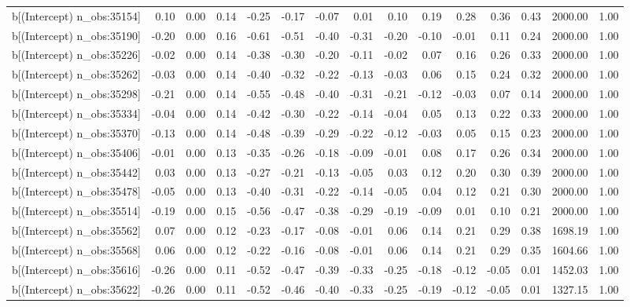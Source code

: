 \begin{table}[ht]
\begin{tabular}{rrrrrrrrrrrrrrr}
  b[(Intercept) n\_obs:35154] & 0.10 & 0.00 & 0.14 & -0.25 & -0.17 & -0.07 & 0.01 & 0.10 & 0.19 & 0.28 & 0.36 & 0.43 & 2000.00 & 1.00 \\ 
  b[(Intercept) n\_obs:35190] & -0.20 & 0.00 & 0.16 & -0.61 & -0.51 & -0.40 & -0.31 & -0.20 & -0.10 & -0.01 & 0.11 & 0.24 & 2000.00 & 1.00 \\ 
  b[(Intercept) n\_obs:35226] & -0.02 & 0.00 & 0.14 & -0.38 & -0.30 & -0.20 & -0.11 & -0.02 & 0.07 & 0.16 & 0.26 & 0.33 & 2000.00 & 1.00 \\ 
  b[(Intercept) n\_obs:35262] & -0.03 & 0.00 & 0.14 & -0.40 & -0.32 & -0.22 & -0.13 & -0.03 & 0.06 & 0.15 & 0.24 & 0.32 & 2000.00 & 1.00 \\ 
  b[(Intercept) n\_obs:35298] & -0.21 & 0.00 & 0.14 & -0.55 & -0.48 & -0.40 & -0.31 & -0.21 & -0.12 & -0.03 & 0.07 & 0.14 & 2000.00 & 1.00 \\ 
  b[(Intercept) n\_obs:35334] & -0.04 & 0.00 & 0.14 & -0.42 & -0.30 & -0.22 & -0.14 & -0.04 & 0.05 & 0.13 & 0.22 & 0.33 & 2000.00 & 1.00 \\ 
  b[(Intercept) n\_obs:35370] & -0.13 & 0.00 & 0.14 & -0.48 & -0.39 & -0.29 & -0.22 & -0.12 & -0.03 & 0.05 & 0.15 & 0.23 & 2000.00 & 1.00 \\ 
  b[(Intercept) n\_obs:35406] & -0.01 & 0.00 & 0.13 & -0.35 & -0.26 & -0.18 & -0.09 & -0.01 & 0.08 & 0.17 & 0.26 & 0.34 & 2000.00 & 1.00 \\ 
  b[(Intercept) n\_obs:35442] & 0.03 & 0.00 & 0.13 & -0.27 & -0.21 & -0.13 & -0.05 & 0.03 & 0.12 & 0.20 & 0.30 & 0.39 & 2000.00 & 1.00 \\ 
  b[(Intercept) n\_obs:35478] & -0.05 & 0.00 & 0.13 & -0.40 & -0.31 & -0.22 & -0.14 & -0.05 & 0.04 & 0.12 & 0.21 & 0.30 & 2000.00 & 1.00 \\ 
  b[(Intercept) n\_obs:35514] & -0.19 & 0.00 & 0.15 & -0.56 & -0.47 & -0.38 & -0.29 & -0.19 & -0.09 & 0.01 & 0.10 & 0.21 & 2000.00 & 1.00 \\ 
  b[(Intercept) n\_obs:35562] & 0.07 & 0.00 & 0.12 & -0.23 & -0.17 & -0.08 & -0.01 & 0.06 & 0.14 & 0.21 & 0.29 & 0.38 & 1698.19 & 1.00 \\ 
  b[(Intercept) n\_obs:35568] & 0.06 & 0.00 & 0.12 & -0.22 & -0.16 & -0.08 & -0.01 & 0.06 & 0.14 & 0.21 & 0.29 & 0.35 & 1604.66 & 1.00 \\ 
  b[(Intercept) n\_obs:35616] & -0.26 & 0.00 & 0.11 & -0.52 & -0.47 & -0.39 & -0.33 & -0.25 & -0.18 & -0.12 & -0.05 & 0.01 & 1452.03 & 1.00 \\ 
  b[(Intercept) n\_obs:35622] & -0.26 & 0.00 & 0.11 & -0.52 & -0.46 & -0.40 & -0.33 & -0.25 & -0.19 & -0.12 & -0.05 & 0.01 & 1327.15 & 1.00 \\ 

\end{tabular}
\end{table}
